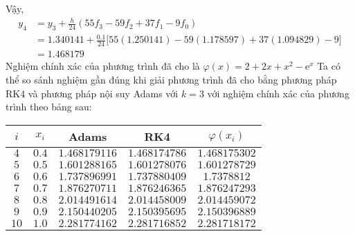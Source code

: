 Vậy,
\begin{align*}
	y_4&=y_3+\frac{h}{24}(55f_3-59f_2+37f_1-9f_0)\\
	   &=1.340141+\frac{0.1}{24}\big[55(1.250141)-59(1.178597)+37(1.094829)-9\big]\\
	   &=1.468179
\end{align*}
Nghiệm chính xác của phương trình đã cho là $\varphi(x)=2+2x+x^2-\mathrm{e}^{x}$
Ta có thể so sánh nghiệm gần đúng khi giải phương trình đã cho bằng phương pháp RK4 và phương pháp nội suy Adams với $k=3$ với nghiệm chính xác của phương trình theo bảng sau:\par

\begin{longtable}{|c|c|c|c|c|}\hline
	$i$  & $x_i$ & Adams         & RK4           & $\varphi(x_i)$ \\ \hline
	\endhead
	$4$  & $0.4$ & $1.468179116$ & $1.468174786$ & $1.468175302$  \\ \hline
	$5$  & $0.5$ & $1.601288165$ & $1.601278076$ & $1.601278729$  \\ \hline
	$6$  & $0.6$ & $1.737896991$ & $1.737880409$ & $1.7378812$    \\ \hline
	$7$  & $0.7$ & $1.876270711$ & $1.876246365$ & $1.876247293$  \\ \hline
	$8$  & $0.8$ & $2.014491614$ & $2.014458009$ & $2.014459072$  \\ \hline
	$9$  & $0.9$ & $2.150440205$ & $2.150395695$ & $2.150396889$  \\ \hline
	$10$ & $1.0$ & $2.281774162$ & $2.281716852$ & $2.281718172$  \\ \hline
\end{longtable}

